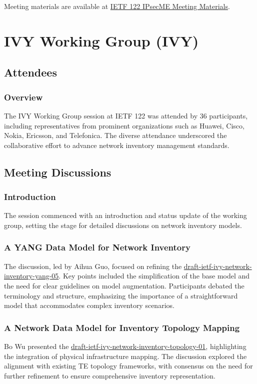 \documentclass{article}
\begin{document}
Meeting materials are available at \href{https://meetings.conf.meetecho.com/ietf122/?group=ipsecme&short=&item=1}{IETF 122 IPsecME Meeting Materials}.



\newpage

\section{IVY Working Group (IVY)}

\subsection{Attendees}
\subsubsection{Overview}
The IVY Working Group session at IETF 122 was attended by 36 participants, including representatives from prominent organizations such as Huawei, Cisco, Nokia, Ericsson, and Telefonica. The diverse attendance underscored the collaborative effort to advance network inventory management standards.

\subsection{Meeting Discussions}

\subsubsection{Introduction}
The session commenced with an introduction and status update of the working group, setting the stage for detailed discussions on network inventory models.

\subsubsection{A YANG Data Model for Network Inventory}
The discussion, led by Aihua Guo, focused on refining the \href{https://datatracker.ietf.org/doc/html/draft-ietf-ivy-network-inventory-yang-05}{draft-ietf-ivy-network-inventory-yang-05}. Key points included the simplification of the base model and the need for clear guidelines on model augmentation. Participants debated the terminology and structure, emphasizing the importance of a straightforward model that accommodates complex inventory scenarios.

\subsubsection{A Network Data Model for Inventory Topology Mapping}
Bo Wu presented the \href{https://datatracker.ietf.org/doc/draft-ietf-ivy-network-inventory-topology-01}{draft-ietf-ivy-network-inventory-topology-01}, highlighting the integration of physical infrastructure mapping. The discussion explored the alignment with existing TE topology frameworks, with consensus on the need for further refinement to ensure comprehensive inventory representation.
\end{document}
